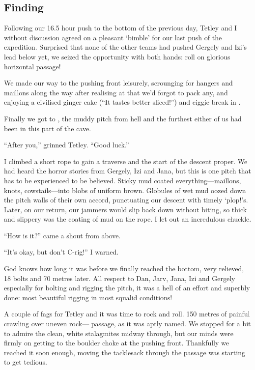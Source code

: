 

\subsection{\texorpdfstring{Finding
}{Finding Salvation}}

Following our 16.5 hour push to the bottom of  the
previous day, Tetley and I without discussion agreed on a pleasant
`bimble' for our last push of the expedition. Surprised that none of the
other teams had pushed Gergely and Izi's lead below  yet, we seized the opportunity with both hands: roll on
glorious horizontal passage!

We made our way to the pushing front leisurely, scrounging for hangers
and maillons along the way after realising at  that we'd
forgot to pack any, and enjoying a civilised ginger cake (``It tastes
better sliced!'') and ciggie break in .

Finally we got to , the muddy pitch from hell
and the furthest either of us had been in this part of the cave.

``After you,'' grinned Tetley. ``Good luck.''

I climbed a short rope to gain a traverse and the start of the descent
proper. We had heard the horror stories from Gergely, Izi and Jana, but
this is one pitch that has to be experienced to be believed. Sticky mud
coated everything---maillons, knots, cowstails---into blobs of uniform
brown. Globules of wet mud oozed down the pitch walls of their own
accord, punctuating our descent with timely `plop!'s. Later, on our
return, our jammers would slip back down without biting, so thick and
slippery was the coating of mud on the rope. I let out an incredulous
chuckle.

``How is it?'' came a shout from above.

``It's okay, but don't C-rig!'' I warned.

God knows how long it was before we finally reached the bottom, very
relieved, 18 bolts and 70 metres later. All respect to Dan, Jarv, Jana,
Izi and Gergely especially for bolting and rigging the pitch, it was a
hell of an effort and superbly done: most beautiful rigging in most
squalid conditions!

A couple of fags for Tetley and it was time to rock and roll. 150 metres
of painful crawling over uneven rock--- passage, as it
was aptly named. We stopped for a bit to admire the clean, white
stalagmites midway through, but our minds were firmly on getting to the
boulder choke at the pushing front. Thankfully we reached it soon
enough, moving the tacklesack through the passage was starting to get
tedious.

